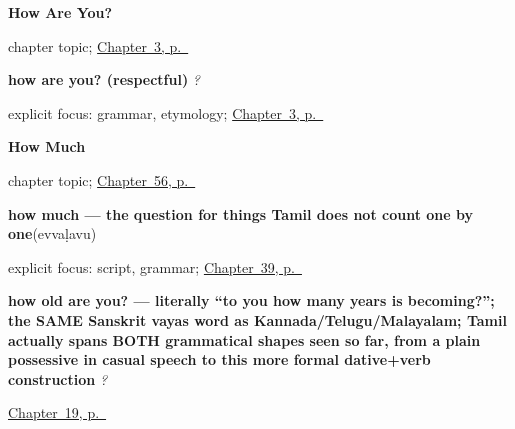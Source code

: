 \noindent\begin{minipage}[t]{\linewidth}
\raggedright
\textbf{How Are You?}\par
\footnotesize chapter topic; \hyperref[ch:responding]{Chapter~3, p.~\pageref*{ch:responding}}
\end{minipage}\par\smallskip

\noindent\begin{minipage}[t]{\linewidth}
\raggedright
\textbf{how are you? (respectful)}\enspace\emph{  ?}\par
\footnotesize explicit focus: grammar, etymology; \hyperref[ch:responding]{Chapter~3, p.~\pageref*{ch:responding}}
\end{minipage}\par\smallskip

\noindent\begin{minipage}[t]{\linewidth}
\raggedright
\textbf{How Much}\par
\footnotesize chapter topic; \hyperref[ch:ta-how-much]{Chapter~56, p.~\pageref*{ch:ta-how-much}}
\end{minipage}\par\smallskip

\noindent\begin{minipage}[t]{\linewidth}
\raggedright
\textbf{how much — the question for things Tamil does not count one by one}\enspace\emph{}\enspace(evvaḷavu)\par
\footnotesize explicit focus: script, grammar; \hyperref[ch:ta-asking-for-what-you-want]{Chapter~39, p.~\pageref*{ch:ta-asking-for-what-you-want}}
\end{minipage}\par\smallskip

\noindent\begin{minipage}[t]{\linewidth}
\raggedright
\textbf{how old are you? — literally \textquotedblleft{}to you how many years is becoming?\textquotedblright{}; the SAME Sanskrit vayas word as Kannada/Telugu/Malayalam; Tamil actually spans BOTH grammatical shapes seen so far, from a plain possessive in casual speech to this more formal dative+verb construction}\enspace\emph{   ?}\par
\footnotesize \hyperref[ch:ta-asking-age]{Chapter~19, p.~\pageref*{ch:ta-asking-age}}
\end{minipage}\par\smallskip

